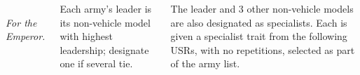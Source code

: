 \begin{columns}
\vfill
\noindent%
\begin{minipage}[b]{1.0\linewidth}\centering\small\it%
\\
For the Emperor.
\end{minipage}
\vfill

\columnbreak

%


\vspace{-9pt}%
 Each army's leader is its non-vehicle
model with highest leadership; designate one if several tie.

  The leader and 3 other
non-vehicle models are also designated as specialists.  Each is given
a specialist trait from the following USRs, with no repetitions,
selected as part of the army list.


\end{columns}
